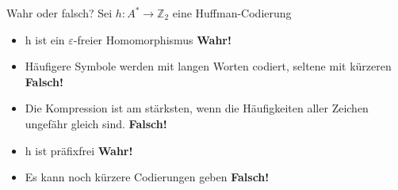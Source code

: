 \documentclass[handout]{beamer}
\begin{document}
\begin{frame}{Wahr oder falsch?}
Sei $h: A^* \rightarrow \mathbb{Z}_2$ eine Huffman-Codierung
\begin{itemize}
	\item h ist ein $\varepsilon$-freier Homomorphismus \pause \textbf{Wahr!}\pause
	\item Häufigere Symbole werden mit langen Worten codiert, seltene mit kürzeren \pause \textbf{Falsch!}\pause
	\item Die Kompression ist am stärksten, wenn die Häufigkeiten aller Zeichen ungefähr gleich sind. \pause \textbf{Falsch!} \pause
	\item h ist präfixfrei \pause \textbf{Wahr!} \pause
	\item Es kann noch kürzere Codierungen geben \pause \textbf{Falsch!}
\end{itemize}
\end{frame}


\end{document}
